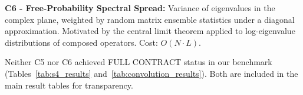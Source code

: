 \documentclass[twoside]{article}
\begin{document}
\textbf{C6 - Free-Probability Spectral Spread:} Variance of eigenvalues in the complex plane, weighted by random matrix ensemble statistics under a diagonal approximation. Motivated by the central limit theorem applied to log-eigenvalue distributions of composed operators. Cost: $O(N \cdot L)$.

Neither C5 nor C6 achieved \textsc{FULL CONTRACT} status in our benchmark (Tables~\ref{tab:s4_results} and~\ref{tab:convolution_results}). Both are included in the main result tables for transparency.



\end{document}
